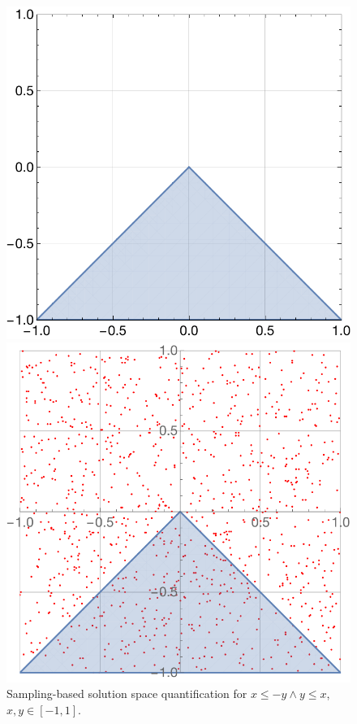 \begin{figure}[ht]
\centering
\begin{minipage}[b]{0.45\linewidth}
\includegraphics[width=1\linewidth]{plot_sampling01}
\end{minipage}
\quad
\begin{minipage}[b]{0.45\linewidth}
\includegraphics[width=1\linewidth]{plot_sampling02}
\end{minipage}
\caption{Sampling-based solution space quantification for $x \leq -y \land y \leq x$, $x, y \in [-1, 1]$.}
\label{fig:sampling-based}
\end{figure}

